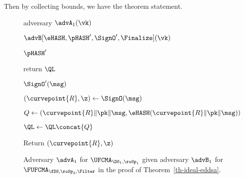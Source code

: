 	 Then by collecting bounds, we have the theorem statement.
	\begin{figure}[t]
		{	
			\begin{algorithm-initial}{adversary $\advA_1(\vk)$}
				\item $\advB[\eHASH, \pHASH^{\prime}, \SignO^{\prime}, \Finalize](\vk)$
			\end{algorithm-initial}  \vspace{2pt} 
			\begin{algorithm-subsequent}{$\pHASH^{\prime}$}
				\item return $\QL$
			\end{algorithm-subsequent}  
			\begin{algorithm-subsequent}{$\SignO^{\prime}(\msg)$}
				\item $(\curvepoint{R}, \z) \gets \SignO(\msg)$
				\item $Q \gets (\curvepoint{R}\|\pk\|\msg, \eHASH(\curvepoint{R}\|\pk\|\msg))$
				\item $\QL \gets \QL \concat \{Q\}$
				\item Return $(\curvepoint{R}, \z)$
			\end{algorithm-subsequent}
		}
		\vspace{-5pt}
		\caption{Adversary $\advA_1$ for $\UFCMA_{\DS_1,\roSp_1}$ given adversary $\advB_1$ for $\FUFCMA_{\fDS,\roSp_2,\Filter}$ in the proof of Theorem~\ref{th-ideal-eddsa}.}
		\label{fig:A1}
		\hrulefill
		\vspace{-10pt}
	\end{figure}
